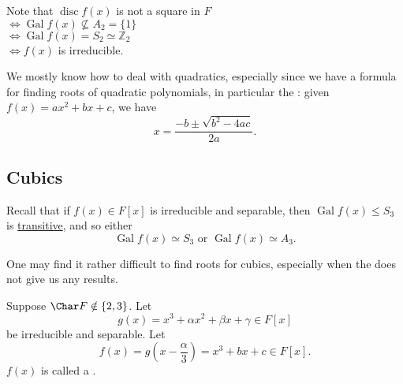 \documentclass[notoc,notitlepage,nobib]{tufte-book}
\DeclareMathOperator{\disc}{disc}
\DeclareMathOperator{\Gal}{Gal}
\begin{document}
Note that $\disc f(x)$ is not a square in $F$ \\
$\iff \Gal f(x) \not\subseteq A_2 = \{1\}$ \\
$\iff \Gal f(x) = S_2 \simeq \mathbb{Z}_2$ \\
$\iff f(x)$ is irreducible.

We mostly know how to deal with quadratics, especially since we have a formula
for finding roots of quadratic polynomials, in particular the : given $f(x) = ax^2 + bx + c$, we have
\begin{equation*}
  x = \frac{-b \pm \sqrt{b^2 - 4ac}}{2a}.
\end{equation*}


\subsection{Cubics}%
\label{sub:cubics}

Recall that if $f(x) \in F[x]$ is irreducible and separable, then $\Gal f(x)
\leq S_3$ is
\hyperref[crly:the_galois_group_of_a_separable_irreducible_polynomial_is_transitive]{transitive},
and so either
\begin{equation*}
  \Gal f(x) \simeq S_3 \text{ or } \Gal f(x) \simeq A_3.
\end{equation*}

One may find it rather difficult to find roots for cubics, especially when the
 does not give us any results.

\begin{defn}\label{defn:depressed_cubic}
  Suppose $\Char F \notin \{2, 3\}$. Let
  \begin{equation*}
    g(x) = x^3 + \alpha x^2 + \beta x + \gamma \in F[x]
  \end{equation*}
  be irreducible and separable. Let
  \begin{equation*}
    f(x) = g \left( x - \frac{\alpha}{3} \right) = x^3 + bx + c \in F[x].
  \end{equation*}
  $f(x)$ is called a .
\end{defn}
\end{document}
